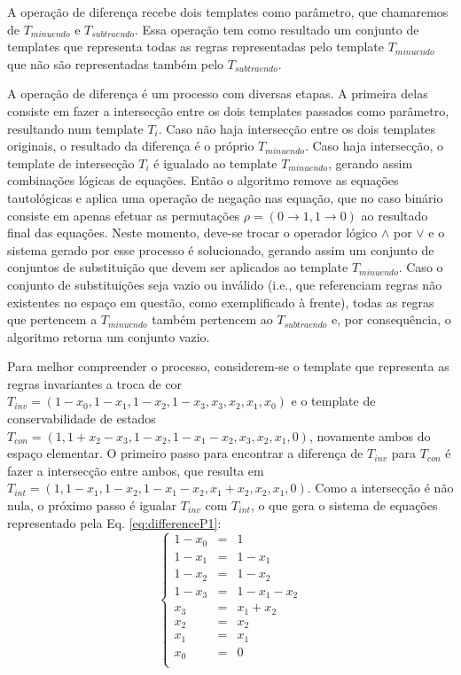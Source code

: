 \documentclass[12pt, a4paper]{article}
\begin{document}
A operação de diferença recebe dois templates como parâmetro, que chamaremos de $T_{minuendo}$ e $T_{subtraendo}$. Essa operação tem como resultado um conjunto de templates que representa todas as regras representadas pelo template $T_{minuendo}$ que não são representadas também pelo $T_{subtraendo}$.

A operação de diferença é um processo com diversas etapas. A primeira delas consiste em fazer a intersecção entre os dois templates passados como parâmetro, resultando num template $T_i$. Caso não haja intersecção entre os dois templates originais, o resultado da diferença é o próprio $T_{minuendo}$. Caso haja intersecção, o template de intersecção $T_i$ é igualado ao template $T_{minuendo}$, gerando assim combinações lógicas de equações. Então o algoritmo remove as equações tautológicas e aplica uma operação de negação nas equação, que no caso binário consiste em apenas efetuar as permutações $\rho = (0 \to 1, 1 \to 0)$ ao resultado final das equações. Neste momento, deve-se trocar o operador lógico $\wedge$ por $\vee$ e o sistema gerado por esse processo é solucionado, gerando assim um conjunto de conjuntos de substituição que devem ser aplicados ao template $T_{minuendo}$. Caso o conjunto de substituições seja vazio ou inválido (i.e., que referenciam regras não existentes no espaço em questão, como exemplificado à frente), todas as regras que pertencem a $T_{minuendo}$ também pertencem ao $T_{subtraendo}$ e, por consequência, o algoritmo retorna um conjunto vazio.

Para melhor compreender o processo, considerem-se o template que representa as regras invariantes a troca de cor $T_{inv} = (1 - x_0, 1 - x_1, 1 - x_2, 1 - x_3, x_3, x_2, x_1, x_0)$ e o template de conservabilidade de estados $T_{con} = (1, 1 + x_2 - x_3, 1 - x_2, 1 - x_1 - x_2, x_3, x_2, x_1, 0)$, novamente ambos do espaço elementar. O primeiro passo para encontrar a diferença de $T_{inv}$ para $T_{con}$ é fazer a intersecção entre ambos, que resulta em $T_{int} = (1, 1 - x_1, 1 - x_2, 1 - x_1 - x_2, x_1 + x_2, x_2, x_1, 0)$. Como a intersecção é não nula, o próximo passo é igualar $T_{inv}$ com $T_{int}$, o que gera o sistema de equações representado pela Eq. \ref{eq:differenceP1}: \begin{equation} \left\{\begin{matrix} 1 - x_0	& = &	1				\\ 1 - x_1	& = &	1 - x_1			\\ 1 - x_2	& = &	1 - x_2			\\ 1 - x_3	& = &	1 - x_1 - x_2	\\
x_3		& = &	x_1 + x_2		\\
x_2		& = &	x_2				\\
x_1		& = &	x_1				\\
x_0		& = &	0				\\
\end{matrix}\right.
\label{eq:differenceP1}
\end{equation}
\end{document}
